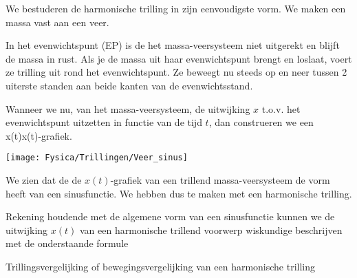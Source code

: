 \documentclass{ximera}
\begin{document}
    \author{Ingmar Herreman}
    \date{Januari 2024}
  
    
We bestuderen de harmonische trilling in zijn eenvoudigste vorm. We maken een massa vast aan een veer.

In het evenwichtspunt (EP) is de het massa-veersysteem niet uitgerekt en blijft de massa in rust. Als je de massa uit haar evenwichtspunt brengt en loslaat, voert ze trilling uit rond het evenwichtspunt. Ze beweegt nu steeds op en neer tussen 2 uiterste standen aan beide kanten van de evenwichtsstand.
\begin{center}
\end{center}
Wanneer we nu, van het massa-veersysteem, de uitwijking $x$ t.o.v. het evenwichtspunt uitzetten in functie van de tijd $t$, dan construeren we een x(t)x(t)-grafiek.

            \begin{center}
                \texttt{[image: Fysica/Trillingen/Veer\_sinus]}
            \end{center}

We zien dat de de $x(t)$-grafiek van een trillend massa-veersysteem de vorm heeft van een sinusfunctie. We hebben dus te maken met een harmonische trilling.

Rekening houdende met de algemene vorm van een sinusfunctie kunnen we de uitwijking $x(t)$ van een harmonische trillend voorwerp wiskundige beschrijven met de onderstaande formule
\begin{definition}{Trillingsvergelijking of bewegingsvergelijking van een harmonische trilling}
\begin{center}
\end{center}
\end{definition}
\end{document}

